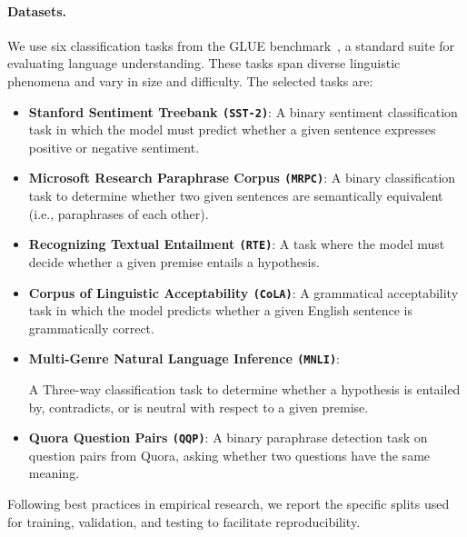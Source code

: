 \paragraph{Datasets.}
We use six classification tasks from the \acf{GLUE} benchmark~\cite{wang_glue_2019}, a standard suite for evaluating language understanding.
These tasks span diverse linguistic phenomena and vary in size and difficulty. 
The selected tasks are:
\begin{itemize}
    \item \textbf{Stanford Sentiment Treebank \texttt{(SST-2)}}:  
    A binary sentiment classification task in which the model must predict whether a given sentence expresses positive or negative sentiment.

    \item \textbf{Microsoft Research Paraphrase Corpus \texttt{(MRPC)}}:  
    A binary classification task to determine whether two given sentences are semantically equivalent (i.e., paraphrases of each other).

    \item \textbf{Recognizing Textual Entailment \texttt{(RTE)}}:  
    A task where the model must decide whether a given premise entails a hypothesis.

    \item \textbf{Corpus of Linguistic Acceptability \texttt{(CoLA)}}:  
    A grammatical acceptability task in which the model predicts whether a given English sentence is grammatically correct.

    \item \textbf{Multi-Genre Natural Language Inference \texttt{(MNLI)}}:  
    
    A Three-way classification task to determine whether a hypothesis is entailed by, contradicts, or is neutral with respect to a given premise.

    \item \textbf{Quora Question Pairs \texttt{(QQP)}}:  
    A binary paraphrase detection task on question pairs from Quora, asking whether two questions have the same meaning.
\end{itemize}

Following best practices in empirical research, we report the specific splits used for training, validation, and testing to facilitate reproducibility.

